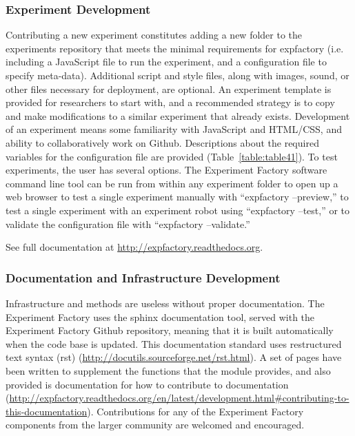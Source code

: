 \documentclass{report}
\begin{document}
\subsubsection{Experiment Development}
Contributing a new experiment constitutes adding a new folder to the
experiments repository that meets the minimal requirements for
expfactory (i.e. including a JavaScript file to run the experiment, and
a configuration file to specify meta-data). Additional script and style
files, along with images, sound, or other files necessary for
deployment, are optional. An experiment template is provided for
researchers to start with, and a recommended strategy is to copy and
make modifications to a similar experiment that already exists.
Development of an experiment means some familiarity with JavaScript and
HTML/CSS, and ability to collaboratively work on Github. Descriptions
about the required variables for the configuration file are provided
(Table~\ref{table:table41}). To test experiments, the user has several options. The
Experiment Factory software command line tool can be run from within any
experiment folder to open up a web browser to test a single experiment
manually with ``expfactory --preview,'' to test a single experiment with an experiment robot using ``expfactory --test,'' or to validate the configuration file with ``expfactory --validate.''

See full documentation at \href{http://expfactory.readthedocs.org}{http://expfactory.readthedocs.org}.

\subsubsection{Documentation and Infrastructure
Development}

Infrastructure and methods are useless without proper documentation. The
Experiment Factory uses the sphinx documentation tool, served with the
Experiment Factory Github repository, meaning that it is built
automatically when the code base is updated. This documentation standard
uses restructured text syntax (rst)
(\href{http://docutils.sourceforge.net/rst.html}{http://docutils.sourceforge.net/rst.html}). A set of pages have been
written to supplement the functions that the module provides, and also
provided is documentation for how to contribute to documentation (\href{http://expfactory.readthedocs.org/en/latest/development.html\#contributing-to-this-documentation}{http://expfactory.readthedocs.org/en/latest/development.html\#contributing-to-this-documentation}).
Contributions for any of the Experiment Factory components from the
larger community are welcomed and encouraged.
\end{document}
